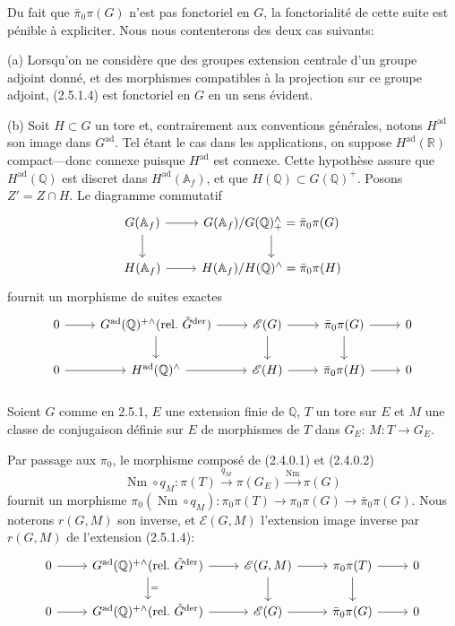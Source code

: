 \documentclass[12pt,a4paper]{article}
\theoremstyle{plain}
\theoremstyle{definition}
\theoremstyle{remark}
\DeclareMathOperator{\Nm}{Nm}
\newcommand{\QQ}{\mathbb{Q}}
\newcommand{\RR}{\mathbb{R}}
\newcommand{\Af}{\mathbb{A}_f}
\begin{document}
\subsubsection{}

Du fait que $\bar{\pi}_0\pi(G)$ n'est pas fonctoriel en $G$, la fonctorialit\'e de cette suite est p\'enible \`a expliciter. Nous nous contenterons des deux cas suivants:

(a) Lorsqu'on ne consid\`ere que des groupes extension centrale d'un groupe adjoint donn\'e, et des morphismes compatibles \`a la projection sur ce groupe adjoint, (2.5.1.4) est fonctoriel en $G$ en un sens \'evident.

(b) Soit $H \subset G$ un tore et, contrairement aux conventions g\'en\'erales, notons $H^{\text{ad}}$ son image dans $G^{\text{ad}}$. Tel \'etant le cas dans les applications, on suppose $H^{\text{ad}}(\RR)$ compact---donc connexe puisque $H^{\text{ad}}$ est connexe. Cette hypoth\`ese assure que $H^{\text{ad}}(\QQ)$ est discret dans $H^{\text{ad}}(\Af)$, et que $H(\QQ) \subset G(\QQ)^+$. Posons $Z' = Z \cap H$. Le diagramme commutatif
\[
\begin{tikzcd}
G(\Af) \arrow[r] \arrow[d] & G(\Af)/G(\QQ)_+^{\wedge} = \bar{\pi}_0\pi(G) \arrow[d] \\
H(\Af) \arrow[r] & H(\Af)/H(\QQ)^{\wedge} = \bar{\pi}_0\pi(H)
\end{tikzcd}
\]
fournit un morphisme de suites exactes
\[
\begin{tikzcd}
0 \arrow[r] & G^{\text{ad}}(\QQ)^{+\wedge}(\text{rel.~}\tilde{G}^{\text{der}}) \arrow[r] \arrow[d] & \mathscr{E}(G) \arrow[r] \arrow[d] & \bar{\pi}_0\pi(G) \arrow[r] \arrow[d] & 0 \\
0 \arrow[r] & H^{\text{ad}}(\QQ)^{\wedge} \arrow[r] & \mathscr{E}(H) \arrow[r] & \bar{\pi}_0\pi(H) \arrow[r] & 0
\end{tikzcd}
\]

\subsubsection{}

Soient $G$ comme en 2.5.1, $E$ une extension finie de $\QQ$, $T$ un tore sur $E$ et $M$ une classe de conjugaison d\'efinie sur $E$ de morphismes de $T$ dans $G_E$: $M: T \to G_E$.

Par passage aux $\pi_0$, le morphisme compos\'e de (2.4.0.1) et (2.4.0.2)
\[
\Nm \circ q_M: \pi(T) \xrightarrow{q_M} \pi(G_E) \xrightarrow{\Nm} \pi(G)
\]
fournit un morphisme $\pi_0(\Nm \circ q_M): \pi_0\pi(T) \to \pi_0\pi(G) \to \bar{\pi}_0\pi(G)$. Nous noterons $r(G,M)$ son inverse, et $\mathscr{E}(G,M)$ l'extension image inverse par $r(G,M)$ de l'extension (2.5.1.4):
\[
\begin{tikzcd}
0 \arrow[r] & G^{\text{ad}}(\QQ)^{+\wedge}(\text{rel.~}\tilde{G}^{\text{der}}) \arrow[r] \arrow[d, "="] & \mathscr{E}(G,M) \arrow[r] \arrow[d] & \pi_0\pi(T) \arrow[r] \arrow[d] & 0 \\
0 \arrow[r] & G^{\text{ad}}(\QQ)^{+\wedge}(\text{rel.~}\tilde{G}^{\text{der}}) \arrow[r] & \mathscr{E}(G) \arrow[r] & \bar{\pi}_0\pi(G) \arrow[r] & 0
\end{tikzcd}
\]
\end{document}

